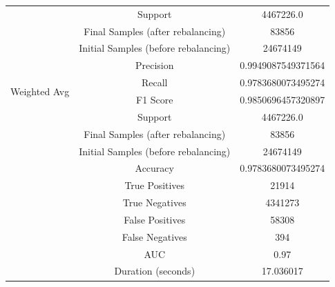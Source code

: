 \begin{longtable}{|c|c|c|}
 & Support & 4467226.0 \\
 & Final Samples (after rebalancing) & 83856 \\
 & Initial Samples (before rebalancing) & 24674149 \\
\hline
\multirow{4}{*}{Weighted Avg} & Precision & 0.9949087549371564 \\
 & Recall & 0.9783680073495274 \\
 & F1 Score & 0.9850696457320897 \\
 & Support & 4467226.0 \\
 & Final Samples (after rebalancing) & 83856 \\
 & Initial Samples (before rebalancing) & 24674149 \\
\hline
& Accuracy & 0.9783680073495274 \\ \hline
& True Positives & 21914 \\ \hline
& True Negatives & 4341273 \\ \hline
& False Positives & 58308 \\ \hline
& False Negatives & 394 \\ \hline
& AUC & 0.97 \\ \hline
& Duration (seconds) & 17.036017 \\ \hline
\end{longtable}


